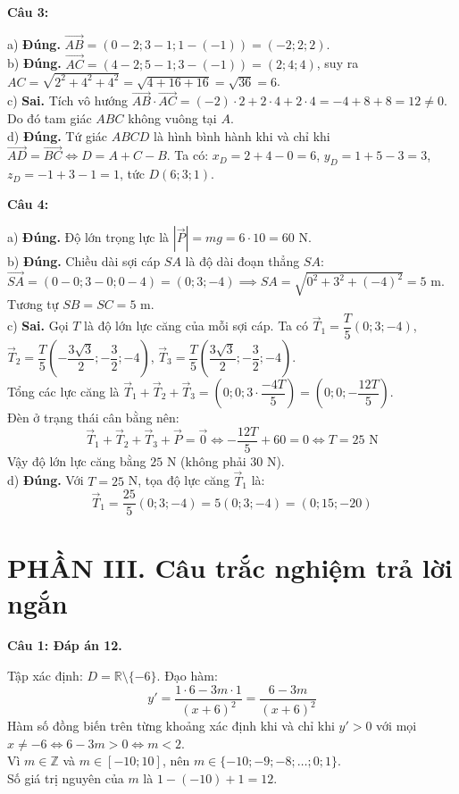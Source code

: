 \documentclass[12pt,a4paper]{article}
\newcommand{\loigiai}[1]{\par\medskip\Needspace{4\baselineskip}\noindent\textbf{#1}\par\nobreak}
\begin{document}
\loigiai{Câu 3:}
a) \textbf{Đúng.} $\overrightarrow{AB}=(0-2;3-1;1-(-1))=(-2;2;2)$.\\
b) \textbf{Đúng.} $\overrightarrow{AC}=(4-2;5-1;3-(-1))=(2;4;4)$, suy ra $AC=\sqrt{2^2+4^2+4^2}=\sqrt{4+16+16}=\sqrt{36}=6$.\\
c) \textbf{Sai.} Tích vô hướng $\overrightarrow{AB}\cdot\overrightarrow{AC}=(-2)\cdot2+2\cdot4+2\cdot4=-4+8+8=12\ne0$. Do đó tam giác $ABC$ không vuông tại $A$.\\
d) \textbf{Đúng.} Tứ giác $ABCD$ là hình bình hành khi và chỉ khi $\overrightarrow{AD}=\overrightarrow{BC}\iff D=A+C-B$. Ta có:
$x_D=2+4-0=6$, $y_D=1+5-3=3$, $z_D=-1+3-1=1$, tức $D(6;3;1)$.

\loigiai{Câu 4:}
a) \textbf{Đúng.} Độ lớn trọng lực là $|\vec P|=mg=6\cdot10=60$ N.\\
b) \textbf{Đúng.} Chiều dài sợi cáp $SA$ là độ dài đoạn thẳng $SA$:
$\overrightarrow{SA}=(0-0;3-0;0-4)=(0;3;-4)\implies SA=\sqrt{0^2+3^2+(-4)^2}=5$ m.\\
Tương tự $SB=SC=5$ m.\\
c) \textbf{Sai.} Gọi $T$ là độ lớn lực căng của mỗi sợi cáp. Ta có $\vec T_1=\dfrac{T}{5}(0;3;-4)$, $\vec T_2=\dfrac{T}{5}\left(-\dfrac{3\sqrt3}{2};-\dfrac{3}{2};-4\right)$, $\vec T_3=\dfrac{T}{5}\left(\dfrac{3\sqrt3}{2};-\dfrac{3}{2};-4\right)$.\\
Tổng các lực căng là $\vec T_1+\vec T_2+\vec T_3=\left(0;0;3\cdot\dfrac{-4T}{5}\right)=\left(0;0;-\dfrac{12T}{5}\right)$.\\
Đèn ở trạng thái cân bằng nên:
\[ \vec T_1+\vec T_2+\vec T_3+\vec P=\vec 0\iff -\dfrac{12T}{5}+60=0\iff T=25\text{ N} \]
Vậy độ lớn lực căng bằng $25$ N (không phải $30$ N).\\
d) \textbf{Đúng.} Với $T=25$ N, tọa độ lực căng $\vec T_1$ là:
\[ \vec T_1=\dfrac{25}{5}(0;3;-4)=5(0;3;-4)=(0;15;-20) \]

\section*{PHẦN III. Câu trắc nghiệm trả lời ngắn}

\loigiai{Câu 1: Đáp án 12.}
Tập xác định: $D=\mathbb R\setminus\{-6\}$. Đạo hàm:
\[ y'=\dfrac{1\cdot6-3m\cdot1}{(x+6)^2}=\dfrac{6-3m}{(x+6)^2} \]
Hàm số đồng biến trên từng khoảng xác định khi và chỉ khi $y'>0$ với mọi $x\ne-6\iff 6-3m>0\iff m<2$.\\
Vì $m\in\mathbb Z$ và $m\in[-10;10]$, nên $m\in\{-10;-9;-8;\dots;0;1\}$.\\
Số giá trị nguyên của $m$ là $1-(-10)+1=12$.
\end{document}
